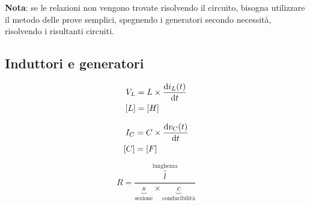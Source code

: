 \documentclass[10pt]{article}
\begin{document}
        \medskip

        \textbf{Nota}: se le relazioni non vengono trovate risolvendo il circuito, bisogna utilizzare il metodo delle
        prove semplici, spegnendo i generatori secondo necessità, risolvendo i risultanti circuiti.

    \vspace{-\baselineskip}
    \subsection*{Induttori e generatori}

        \begin{minipage}[t]{.03\textwidth}
            \vspace{-\baselineskip}
            
            

        \end{minipage}
        \hfill
        \begin{minipage}[t]{.2\textwidth}
            \vspace{-\baselineskip}
            
            \begin{align*}
                V_L &= L \times \dv{i_L (t)}{t}\\
                [L] &= [H]
            \end{align*}

        \end{minipage}
        \hfill
        \begin{minipage}[t]{.03\textwidth}
            \vspace{-\baselineskip}
            
            

        \end{minipage}
        \hfill
        \begin{minipage}[t]{.2\textwidth}
            \vspace{-\baselineskip}
            
            \begin{align*}
                I_C &= C \times \dv{v_C (t)}{t}\\
                [C] &= [F]
            \end{align*}

        \end{minipage}
        \hfill
        \begin{minipage}[t]{.2\textwidth}
            \vspace{-\baselineskip}
            
            \[
                R = \frac{\overbrace{l}^{\text{lunghezza}}}{\underbrace{s}_{\text{sezione}} \times \underbrace{c}_{\text{conducibilità}}}
            \]

        \end{minipage}
\end{document}
